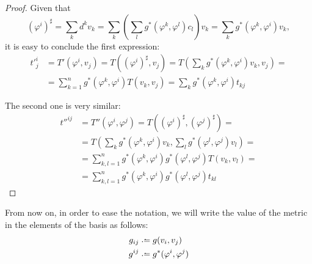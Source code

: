 \begin{proof}
	Given that
	\[
		(\varphi^i)^\sharp = \sum_k d^k v_k = \sum_k (\sum_l g^*(\varphi^k, \varphi^l) c_l) v_k = \sum_k g^*(\varphi^k, \varphi^i) v_k,
	\]
	it is easy to conclude the first expression:
	\begin{align*}
		t'^i_j &= T'(\varphi^i, v_j) = T((\varphi^i)^\sharp, v_j) = T(\sum_k g^*(\varphi^k, \varphi^i) v_k, v_j) = \\
		&= \sum_{k=1}^n g^*(\varphi^k, \varphi^i) T(v_k, v_j) = \sum_k g^*(\varphi^k, \varphi^i) t_{kj}
	\end{align*}

	The second one is very similar:
	\begin{align*}
		t''^{ij} &= T''(\varphi^i, \varphi^j) = T((\varphi^i)^\sharp, (\varphi^j)^\sharp) = \\
		&= T(\sum_k g^*(\varphi^k, \varphi^i) v_k, \sum_l g^*(\varphi^l, \varphi^j) v_l) = \\
		&= \sum_{k,l=1}^n g^*(\varphi^k, \varphi^i) g^*(\varphi^l, \varphi^j) T(v_k, v_l) = \\
		&= \sum_{k,l=1}^n g^*(\varphi^k, \varphi^i) g^*(\varphi^l, \varphi^j) t_{kl}
	\end{align*}
\end{proof}

\begin{remark}
	From now on, in order to ease the notation, we will write the value of the metric in the elements of the basis as follows:
	\begin{align*}
		g_{ij} &\defeq g(v_i, v_j) \\
		g^{ij} &\defeq g^*(\varphi^i, \varphi^j)
	\end{align*}
\end{remark}

